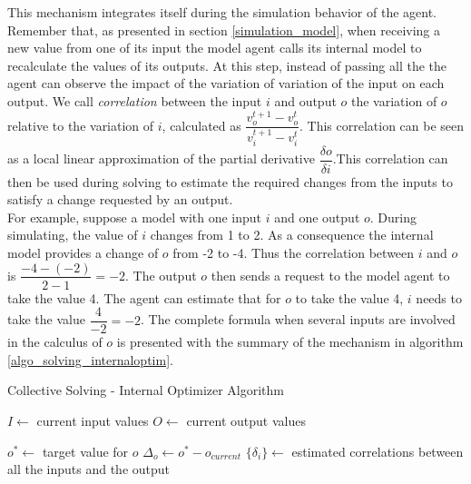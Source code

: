 This mechanism integrates itself during the simulation behavior of the agent. Remember that, as presented in section \ref{simulation_model}, when receiving a new value from one of its input the model agent calls its internal model to recalculate the values of its outputs. At this step, instead of passing all the the agent can observe the impact of the variation of variation of the input on each output. We call \emph{correlation} between the input $i$ and output $o$ the variation of $o$ relative to the variation of $i$, calculated as $\dfrac{v_o^{t+1} - v_o^t}{v_i^{t+1} - v_i^t}$. This correlation can be seen as a local linear approximation of the partial derivative $\dfrac{\delta o}{\delta i}$.This correlation can then be used during solving to estimate the required changes from the inputs to satisfy a change requested by an output.\\
For example, suppose a model with one input $i$ and one output $o$. During simulating, the value of $i$ changes from 1 to 2. As a consequence the internal model provides a change of $o$ from -2 to -4. Thus the correlation between $i$ and $o$ is $\dfrac{-4 - (-2)}{2 - 1} = -2$. The output $o$ then sends a request to the model agent to take the value 4. The agent can estimate that for $o$ to take the value 4, $i$ needs to take the value $\dfrac{4}{-2} = -2$.
The complete formula when several inputs are involved in the calculus of $o$ is presented with the summary of the mechanism in algorithm \ref{algo_solving_internaloptim}.

\begin{algorithm}
\caption{Collective Solving - Internal Optimizer Algorithm}
\label{algo_solving_internaloptim}

\;
$I \leftarrow$ current input values\;
$O \leftarrow$ current output values\;

\BlankLine\BlankLine
{}\;
$o^* \leftarrow $ target value for $o$\;
$\Delta_o \leftarrow o^* - o_{current}$\;
$\{\delta_i\} \leftarrow $ estimated correlations between all the inputs and the output\;
\end{algorithm}

